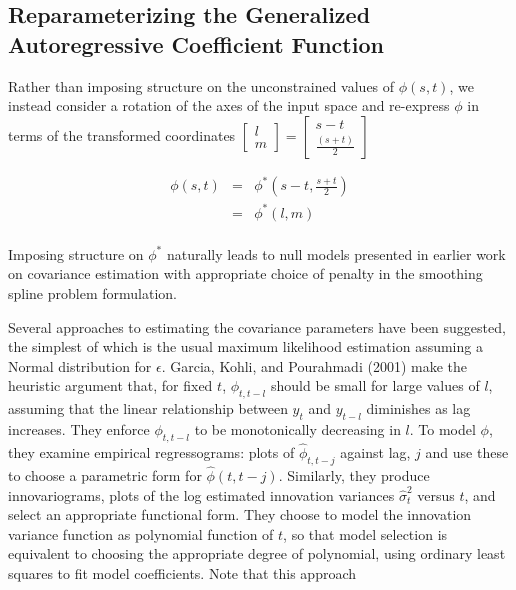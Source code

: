 \subsection{Reparameterizing the Generalized Autoregressive Coefficient Function}
Rather than imposing structure on the unconstrained values of $\phi\left(s,t \right)$, we instead consider a rotation of the axes of the input space and re-express $\phi$ in terms of the transformed coordinates $\begin{bmatrix} l\\ m	
\end{bmatrix} = \begin{bmatrix} s - t\\	 \frac{\left(s + t\right)}{2}\end{bmatrix}$

\begin{eqnarray*}
\phi\left(s,t\right) &=& \phi^*\left(s-t,\frac{s+t}{2}\right) \\
 &=& \phi^*\left(l,m\right)\\
\end{eqnarray*}

Imposing structure on $\phi^*$ naturally leads to null models presented in earlier work on covariance estimation with appropriate choice of penalty in the smoothing spline problem formulation. 
    
    
Several approaches to estimating the covariance parameters have been suggested, the simplest of which is the usual maximum likelihood estimation assuming a Normal distribution for $\epsilon$. Garcia, Kohli, and Pourahmadi (2001) make the heuristic argument that, for fixed $t$, $\phi_{t,t-l}$ should be small for large values of $l$, assuming that the linear relationship between $y_t$ and $y_{t-l}$ diminishes as lag increases. They enforce $\phi_{t,t-l}$ to be monotonically decreasing in $l$. 
To model $\phi$, they examine empirical regressograms: plots of $\hat{\phi}_{t,t-j}$ against lag, $j$ and use these to choose a parametric form for $\hat{\phi}\left(t,t-j\right)$. Similarly, they produce innovariograms, plots of the log estimated innovation variances $\hat{\sigma}_t^2$ versus $t$, and select an appropriate functional form. They choose to model the innovation variance function as polynomial function of $t$, so that model selection is equivalent to choosing the appropriate degree of polynomial, using ordinary least squares to fit model coefficients. Note that this approach 

